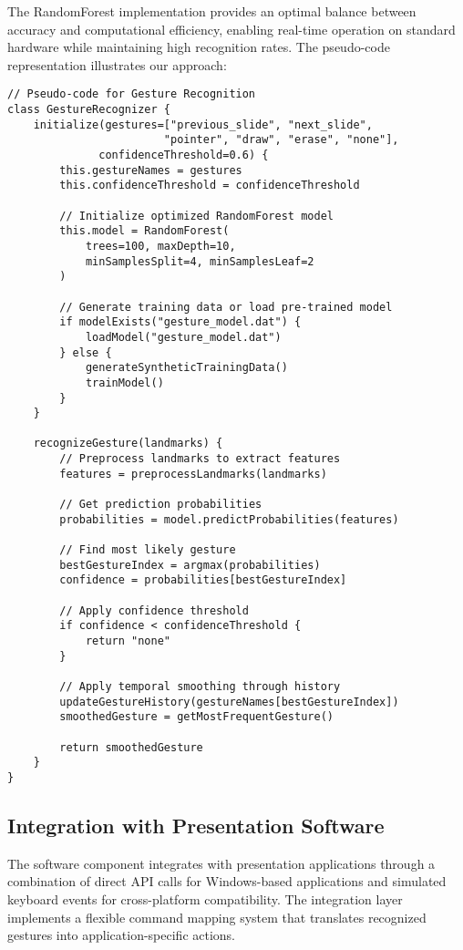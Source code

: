 \documentclass[arxiv,usenatbib]{iupartex}
\begin{document}
The RandomForest implementation provides an optimal balance between accuracy and computational efficiency, enabling real-time operation on standard hardware while maintaining high recognition rates. The pseudo-code representation illustrates our approach:

\begin{lstlisting}[style=codestyle]
// Pseudo-code for Gesture Recognition
class GestureRecognizer {
    initialize(gestures=["previous_slide", "next_slide", 
                        "pointer", "draw", "erase", "none"],
              confidenceThreshold=0.6) {
        this.gestureNames = gestures
        this.confidenceThreshold = confidenceThreshold
        
        // Initialize optimized RandomForest model
        this.model = RandomForest(
            trees=100, maxDepth=10,
            minSamplesSplit=4, minSamplesLeaf=2
        )
        
        // Generate training data or load pre-trained model
        if modelExists("gesture_model.dat") {
            loadModel("gesture_model.dat")
        } else {
            generateSyntheticTrainingData()
            trainModel()
        }
    }
    
    recognizeGesture(landmarks) {
        // Preprocess landmarks to extract features
        features = preprocessLandmarks(landmarks)
        
        // Get prediction probabilities
        probabilities = model.predictProbabilities(features)
        
        // Find most likely gesture
        bestGestureIndex = argmax(probabilities)
        confidence = probabilities[bestGestureIndex]
        
        // Apply confidence threshold
        if confidence < confidenceThreshold {
            return "none"
        }
        
        // Apply temporal smoothing through history
        updateGestureHistory(gestureNames[bestGestureIndex])
        smoothedGesture = getMostFrequentGesture()
        
        return smoothedGesture
    }
}
\end{lstlisting}

\subsection{Integration with Presentation Software}
The software component integrates with presentation applications through a combination of direct API calls for Windows-based applications and simulated keyboard events for cross-platform compatibility. The integration layer implements a flexible command mapping system that translates recognized gestures into application-specific actions.
\end{document}
